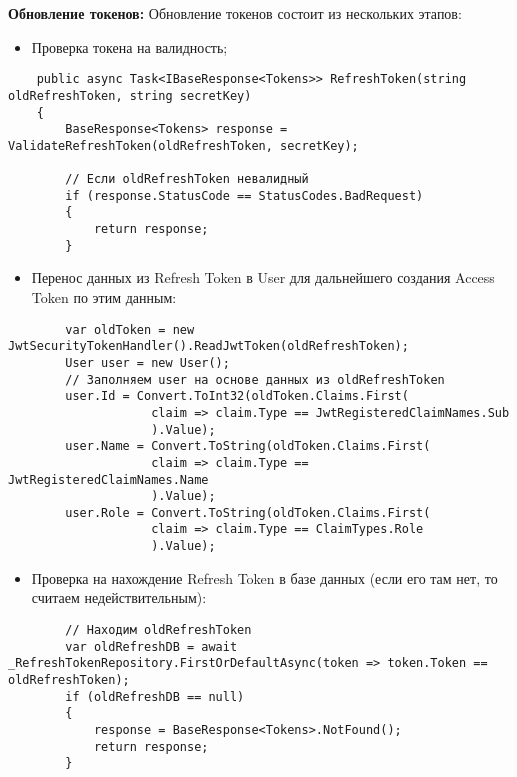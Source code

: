 \textbf{Обновление токенов:} Обновление токенов состоит из нескольких этапов:
\begin{itemize}
	\item{Проверка токена на валидность;}
\end{itemize}
\begin{verbatim}
    public async Task<IBaseResponse<Tokens>> RefreshToken(string oldRefreshToken, string secretKey)
    {
        BaseResponse<Tokens> response = ValidateRefreshToken(oldRefreshToken, secretKey);

        // Если oldRefreshToken невалидный
        if (response.StatusCode == StatusCodes.BadRequest)
        {
            return response;
        }
\end{verbatim}

\begin{itemize}
	\item{Перенос данных из Refresh Token в User для дальнейшего создания Access Token по этим данным:}
\end{itemize}
\begin{verbatim}
        var oldToken = new JwtSecurityTokenHandler().ReadJwtToken(oldRefreshToken);
        User user = new User();
        // Заполняем user на основе данных из oldRefreshToken
        user.Id = Convert.ToInt32(oldToken.Claims.First(
                    claim => claim.Type == JwtRegisteredClaimNames.Sub
                    ).Value);
        user.Name = Convert.ToString(oldToken.Claims.First(
                    claim => claim.Type == JwtRegisteredClaimNames.Name
                    ).Value);
        user.Role = Convert.ToString(oldToken.Claims.First(
                    claim => claim.Type == ClaimTypes.Role
                    ).Value);
\end{verbatim}

\begin{itemize}
	\item{Проверка на нахождение Refresh Token в базе данных (если его там нет, то считаем недействительным):}
\end{itemize}
\begin{verbatim}
        // Находим oldRefreshToken
        var oldRefreshDB = await _RefreshTokenRepository.FirstOrDefaultAsync(token => token.Token == oldRefreshToken);
        if (oldRefreshDB == null)
        {
            response = BaseResponse<Tokens>.NotFound();
            return response;
        }
\end{verbatim}

